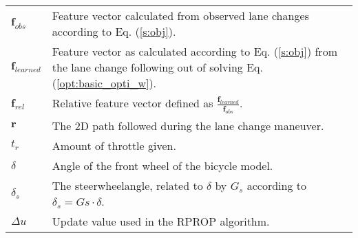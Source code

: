 \documentclass[master=elt,masteroption=eg,english]{kulemt}
\begin{document}
\begin{flushleft}
	\renewcommand{\arraystretch}{1.1}
	\begin{tabularx}{\textwidth}{@{}p{12mm}X@{}}
		$\bm{f}_{obs}$ & Feature vector calculated from observed lane changes according to Eq. (\ref{s:obj}).\\
		$\bm{f}_{learned}$ & Feature vector as calculated according to Eq. (\ref{s:obj}) from the lane change following out of solving Eq. (\ref{opt:basic_opti_w}).\\
		$\bm{f}_{rel}$ & Relative feature vector defined as $\frac{\bm{f}_{learned}}{\bm{f}_{obs}}$.\\
		$\bm{r}$ & The 2D path followed during the lane change maneuver.\\
		$t_r$ & Amount of throttle given.\\
		$\delta$ & Angle of the front wheel of the bicycle model.\\
		$\delta_{s} $ & The steerwheelangle, related to $\delta$ by $G_s$ according to $\delta_s = Gs \cdot\delta$.  \\
		$\Delta u$ & Update value used in the RPROP algorithm.
	\end{tabularx}
\end{flushleft}

\mainmatter







%


\appendixpage*          %
\appendix






\backmatter


%
\end{document}
